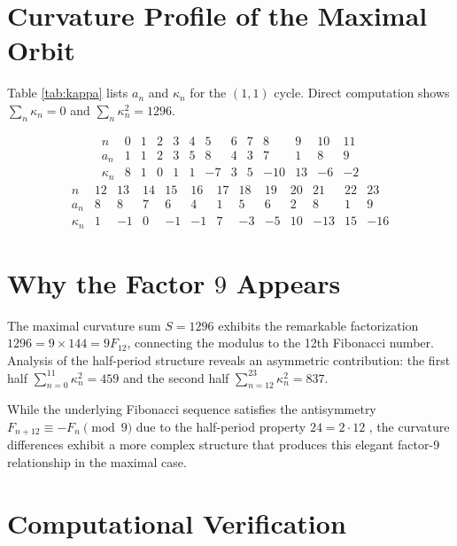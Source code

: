 \documentclass[12pt]{article}
\begin{document}
\section{Curvature Profile of the Maximal Orbit}

Table \ref{tab:kappa} lists $a_n$ and $\kappa_n$ for the $(1,1)$ cycle.
Direct computation shows $\sum_{n}\kappa_n=0$ and
\(\sum_{n}\kappa_n^{2}=1296\).

\begin{table}[h!]
\centering
\[
\begin{array}{c|cccccccccccc}
n & 0 & 1 & 2 & 3 & 4 & 5 & 6 & 7 & 8 & 9 & 10 & 11\\\hline
a_n & 1 & 1 & 2 & 3 & 5 & 8 & 4 & 3 & 7 & 1 & 8 & 9\\
\kappa_n & 8 & 1 & 0 & 1 & 1 & -7 & 3 & 5 & -10 & 13 & -6 & -2
\end{array}
\]
\[
\begin{array}{c|cccccccccccc}
n & 12 & 13 & 14 & 15 & 16 & 17 & 18 & 19 & 20 & 21 & 22 & 23\\\hline
a_n & 8 & 8 & 7 & 6 & 4 & 1 & 5 & 6 & 2 & 8 & 1 & 9\\
\kappa_n & 1 & -1 & 0 & -1 & -1 & 7 & -3 & -5 & 10 & -13 & 15 & -16
\end{array}
\]
\caption{Second differences for the $(1,1)$ orbit.}
\label{tab:kappa}
\end{table}

\section[Why the Factor 9 Appears]{Why the Factor $9$ Appears}

The maximal curvature sum $S=1296$ exhibits the remarkable factorization
$1296=9\times144=9F_{12}$, connecting the modulus to the 12th Fibonacci number.
Analysis of the half-period structure reveals an asymmetric contribution:
the first half \(\sum_{n=0}^{11}\kappa_n^{2}=459\) and the second half
\(\sum_{n=12}^{23}\kappa_n^{2}=837\).

While the underlying Fibonacci sequence satisfies the antisymmetry
\(F_{n+12}\equiv-F_n\pmod9\) due to the half-period property $24=2\cdot12$
\cite{Wall1960}, the curvature differences exhibit a more complex structure
that produces this elegant factor-9 relationship in the maximal case.

\section{Computational Verification}
\end{document}
